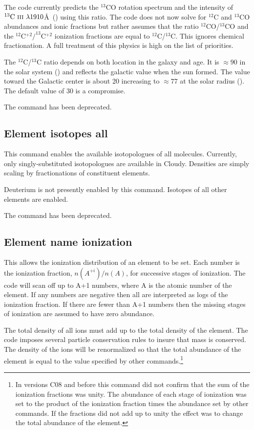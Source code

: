 The code currently predicts the $^{13}$CO rotation spectrum
and the intensity of
$^{13}\mbox{{\rm C~{\sc iii}}}\ \lambda 1910$\AA\ (\citealp{Clegg1997}) using this ratio.
The code does not now solve
for $^{12}$C and $^{13}$CO abundances and ionic fractions
but rather assumes that
the ratio $^{12}$CO/$^{13}$CO and the
$^{12}$C$^{+2}/^{13}$C$^{+2}$ ionization fractions are equal to
$^{12}$C/$^{13}$C.
This ignores chemical fractionation.
A full treatment of this physics is high on the list of priorities.

The $^{12}$C/$^{13}$C ratio depends on both location in the
galaxy and age.
It is $\approx 90$ in the solar system (\citealp{Asplund2009})
and reflects the galactic value when the sun formed.
The value toward the Galactic center
is about 20 increasing to $\approx77$ at the solar radius
(\citealp{Wilson1994}).
The default value of 30 is a compromise.

The command  has been deprecated.

\subsection{Element isotopes all}

This command enables the available isotopologues of all molecules.
Currently, only singly-substituted isotopologues are available in
Cloudy.
Densities are simply scaling by fractionations of constituent elements.

Deuterium is not presently enabled by this command.
Isotopes of all other elements are enabled.

The command  has been deprecated.

\subsection{Element name ionization }

This allows the ionization distribution of an element to be set.
Each
number is the ionization fraction, $n(A^{+i})/n(A)$,
for successive stages of
ionization.
The code will scan off up to A+1 numbers, where A is the atomic
number of the element.
If any numbers are negative then all are interpreted
as logs of the ionization fraction.
If there are fewer than A+1 numbers
then the missing stages of ionization are assumed to have zero abundance.

The total density of all ions must add up to the total density of the element.
The code imposes several particle conservation rules to insure that
mass is conserved.
The density of the ions will be renormalized so that the
total abundance of the element is equal to the value
specified by other commands.\footnote{In versions C08 and before this
command did not confirm that the sum of the ionization fractions
was unity.  The abundance of each stage of ionization was set to the product
of the ionization fraction times the abundance set by other commands.  If the
fractions did not add up to unity the effect was to change the total
abundance of the element.}

